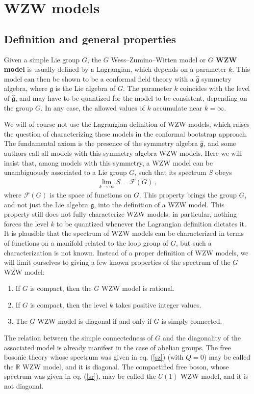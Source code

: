 \documentclass[12pt,a4paper,notitlepage]{report}
\newcommand \R {\mathbb{R}}
\numberwithin{equation}{section}
\theoremstyle{break}
\begin{document}
\section{WZW models}


\subsection{Definition and general properties}

Given a simple Lie group $G$, the $G$ Wess--Zumino--Witten model or $G$ \textbf{\boldmath WZW model} is usually defined by a Lagrangian, which depends on a parameter $k$. This model can then be shown to be a conformal field theory with a $\hat{\mathfrak{g}}$ symmetry algebra, where $\mathfrak{g}$ is the Lie algebra of $G$. The parameter $k$ coincides with the level of $\hat{\mathfrak{g}}$, and may have to be quantized for the model to be consistent, depending on the group $G$. In any case, the allowed values of $k$ accumulate near $k=\infty$.

We will of course not use the Lagrangian definition of WZW models, which raises the question of characterizing these models in the conformal bootstrap approach. The fundamental axiom is the presence of the symmetry algebra $\hat{\mathfrak{g}}$, and some  authors call all models with this symmetry algebra WZW models. Here we will insist that, among models with this symmetry, 
a WZW model can be unambiguously associated to a Lie group $G$, such that its spectrum $S$ obeys
\begin{align}
 \boxed{\underset{k\rightarrow \infty}{\lim} S = \mathcal{F}(G)}\ ,
\label{lsfg}
\end{align}
where $\mathcal{F}(G)$ is the space of functions on $G$. This property brings the group $G$, and not just the Lie algebra $\mathfrak{g}$, into the definition of a WZW model. This property still does not fully characterize WZW models: in particular, nothing forces the level $k$ to be quantized whenever the Lagrangian definition dictates it. It is plausible that the spectrum of WZW models can be characterized in terms of functions on a manifold related to the loop group of $G$, but such a characterization is not known. Instead of a proper definition of WZW models, we will limit ourselves to giving a few known properties of the spectrum of the $G$ WZW model:
\begin{enumerate}
 \item If $G$ is compact, then the $G$ WZW model is rational.
\item If $G$ is compact, then the level $k$ takes positive integer values.
\item The $G$ WZW model is diagonal if and only if $G$ is simply connected. 
\end{enumerate}
The relation between the simple connectedness of $G$ and the diagonality of the associated model is already manifest in the case of abelian groups. The free bosonic theory whose spectrum was given in eq. (\ref{sz}) (with $Q=0$) may be called the $\R$ WZW model, and it is diagonal. The compactified free boson, whose spectrum was given in eq. (\ref{sr}), may be called the $U(1)$ WZW model, and it is not diagonal. 
\end{document}
